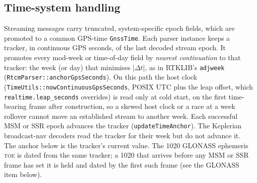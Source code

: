 \documentclass[main.tex]{subfiles}
\begin{document}
\subsection{Time-system handling}\label{sec:rt-time}

Streaming messages carry truncated, system-specific epoch fields, which
are promoted to a common GPS-time \texttt{GnssTime}.  Each parser
instance keeps a tracker, in continuous GPS seconds, of the last decoded
stream epoch.  It promotes every mod-week or time-of-day field by
\emph{nearest continuation} to that tracker: the week (or day) that
minimises $|\Delta t|$, as in RTKLIB's \texttt{adjweek}
(\texttt{RtcmParser::anchorGpsSeconds}).  On this path the host clock
(\texttt{TimeUtils::nowContinuousGpsSeconds}, POSIX UTC plus the leap
offset, which \texttt{realtime.leap\_seconds} overrides) is read only at cold start, on the first time-bearing frame
after construction, so a skewed host clock or a race at a week rollover
cannot move an established stream to another week.  Each successful
MSM or SSR epoch advances the tracker (\texttt{updateTimeAnchor}).  The
Keplerian broadcast-nav decoders read the tracker for their week but do
not advance it.  The anchor below is the tracker's current value.  The
1020 GLONASS ephemeris \textsc{toe} is dated from the same tracker; a
1020 that arrives before any MSM or SSR frame has set it is held and
dated by the first such frame (see the GLONASS item below).
\end{document}
